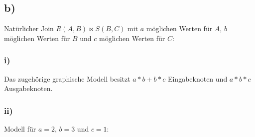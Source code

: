 \documentclass{article}
\begin{document}
\subsection*{b)}
Nat\"urlicher Join $R(A, B) \bowtie S(B, C)$ mit $a$ m\"oglichen
Werten f\"ur $A$, $b$ m\"oglichen Werten f\"ur $B$ und $c$ m\"oglichen Werten f\"ur $C$:
\subsubsection*{i)}
Das zugeh\"orige graphische Modell besitzt $a* b + b* c$ Eingabeknoten und $a*b*c$ Ausgabeknoten.
\subsubsection*{ii)}
Modell f\"ur $a = 2$, $b = 3$ und $c = 1$:
\end{document}
